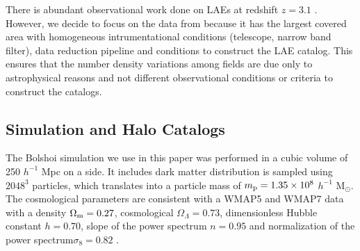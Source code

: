 \documentclass[usenatbib]{mn2e}
\begin{document}
There is abundant observational work done on LAEs at redshift $z=3.1$
\citep{Kudritzki2000,Matsuda2005,Gawiser2007,Nilsson2007,Ouchi2008}.
However, we decide to focus on the data from \cite{Yamada2012} because
it has the largest covered area with homogeneous intrumentational
conditions (telescope, narrow band filter), data reduction pipeline
and conditions to construct the LAE catalog. This ensures that the
number density variations among fields are due only to
astrophysical reasons and not different observational conditions or
criteria to construct the catalogs.


 



\subsection{Simulation and Halo Catalogs}

The Bolshoi simulation \citep{Bolshoi} we use in this paper was
performed in a cubic volume of 250 $h^{-1}$ Mpc on a side. It includes
dark matter distribution is sampled using $2048^{3}$ particles, which
translates into a particle mass of $m_{\rm   p}=1.35\times 10^{8}$
$h^{-1}$ M$_{\odot}$.  The cosmological parameters are consistent with
a WMAP5 and WMAP7 data with a  density $\Omega_{\rm m} = 0.27$,
cosmological  $\Omega_{\Lambda}=0.73$, dimensionless Hubble constant
$h=0.70$, slope of the power spectrum $n=0.95$ and normalization of the
power spectrum$\sigma_{8}=0.82$ \citep{Komatsu2009,Jarosik2011}.  
\end{document}
